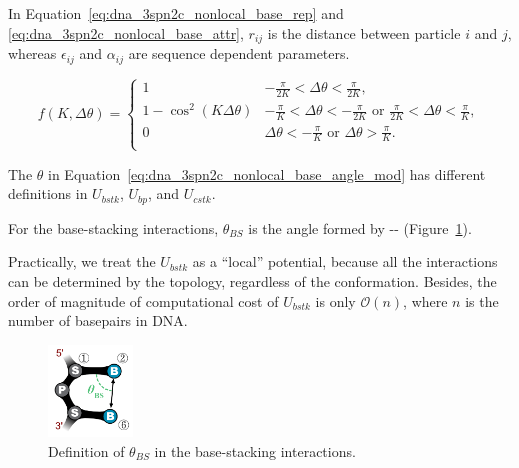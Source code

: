 In Equation~\ref{eq:dna_3spn2c_nonlocal_base_rep} and
\ref{eq:dna_3spn2c_nonlocal_base_attr}, $r_{ij}$ is the distance between
particle $i$ and $j$, whereas $\epsilon_{ij}$ and $\alpha_{ij}$ are sequence
dependent parameters.

\begin{equation}
  \label{eq:dna_3spn2c_nonlocal_base_angle_mod}
  f(K, \Delta \theta) =
  \begin{cases}
    1 & \displaystyle -\frac{\pi}{2K} < \Delta \theta < \frac{\pi}{2K}, \\[.7em]
    1 - \cos^2(K\Delta\theta) & \displaystyle -\frac{\pi}{K} < \Delta \theta < -\frac{\pi}{2K} \textrm{ or } \frac{\pi}{2K} < \Delta \theta < \frac{\pi}{K}, \\[.7em]
    0 & \displaystyle \Delta \theta < -\frac{\pi}{K} \textrm{ or }  \Delta \theta > \frac{\pi}{K}. \\
  \end{cases}
\end{equation}

The $\theta$ in Equation~\ref{eq:dna_3spn2c_nonlocal_base_angle_mod} has
different definitions in $U_{bstk}$, $U_{bp}$, and $U_{cstk}$.

For the base-stacking interactions, $\theta_{BS}$ is the angle formed by
--
(Figure~\ref{fig:DNA_3spn2c_nonbonded_bstk}).

Practically, we treat the $U_{bstk}$ as a ``local'' potential, because all the
interactions can be determined by the topology, regardless of the conformation.
Besides, the order of magnitude of computational cost of $U_{bstk}$ is only
$\mathcal{O}(n)$, where $n$ is the number of basepairs in DNA.

\begin{figure}[ht]
  \centering
  \includegraphics[width=0.2\textwidth]{figures/DNA_3spn2c_nonbonded_bstk.png}
  \caption{Definition of $\theta_{BS}$ in the base-stacking interactions.}
  \label{fig:DNA_3spn2c_nonbonded_bstk}
\end{figure}

